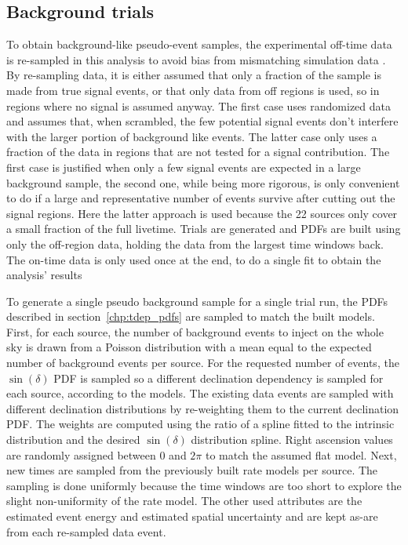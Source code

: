 \subsection*{Background trials}
To obtain background-like pseudo-event samples, the experimental off-time data is re-sampled in this analysis to avoid bias from mismatching simulation data \cite{Aartsen:2016lir}.
By re-sampling data, it is either assumed that only a fraction of the sample is made from true signal events, or that only data from off regions is used, so in regions where no signal is assumed anyway.
The first case uses randomized data and assumes that, when scrambled, the few potential signal events don't interfere with the larger portion of background like events.
The latter case only uses a fraction of the data in regions that are not tested for a signal contribution.
The first case is justified when only a few signal events are expected in a large background sample, the second one, while being more rigorous, is only convenient to do if a large and representative number of events survive after cutting out the signal regions.
Here the latter approach is used because the 22 sources only cover a small fraction of the full livetime.
Trials are generated and PDFs are built using only the off-region data, holding the data from the largest time windows back.
The on-time data is only used once at the end, to do a single fit to obtain the analysis' results

To generate a single pseudo background sample for a single trial run, the PDFs described in section~\ref{chp:tdep_pdfs} are sampled to match the built models.
First, for each source, the number of background events to inject on the whole sky is drawn from a Poisson distribution with a mean equal to the expected number of background events per source.
For the requested number of events, the $\sin(\delta)$ PDF is sampled so a different declination dependency is sampled for each source, according to the models.
The existing data events are sampled with different declination distributions by re-weighting them to the current declination PDF.
The weights are computed using the ratio of a spline fitted to the intrinsic distribution and the desired $\sin(\delta)$ distribution spline.
Right ascension values are randomly assigned between $\num{0}$ and $2\pi$ to match the assumed flat model.
Next, new times are sampled from the previously built rate models per source.
The sampling is done uniformly because the time windows are too short to explore the slight non-uniformity of the rate model.
The other used attributes are the estimated event energy and estimated spatial uncertainty and are kept as-are from each re-sampled data event.

